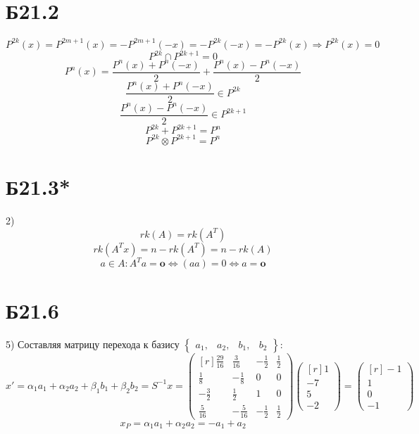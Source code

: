 \section*{Б21.2}
$$P^{2k}(x)=P^{2m+1}(x)=-P^{2m+1}(-x)=-P^{2k}(-x)=-P^{2k}(x)\Rightarrow P^{2k}(x)=0$$
$$P^{2k}\cap P^{2k+1}={0}$$
$$P^{n}(x)=\frac{P^{n}(x)+P^{n}(-x)}{2}+\frac{P^{n}(x)-P^{n}(-x)}{2}$$
$$\frac{P^{n}(x)+P^{n}(-x)}{2}\in P^{2k}$$
$$\frac{P^{n}(x)-P^{n}(-x)}{2}\in P^{2k+1}$$
$$P^{2k}+ P^{2k+1}=P^n$$
$$P^{2k}\otimes P^{2k+1}=P^{n}$$
\section*{Б21.3*}2)
$$rk(A)=rk(A^{T})$$
$$rk(A^{T}x)=n-rk(A^{T})=n-rk(A)$$
$$a\in A:A^{T}a=\textbf{o}\Leftrightarrow (aa)=0\Leftrightarrow a=\textbf{o}$$
\section*{Б21.6}5)
Составляя матрицу перехода к базису $\begin{Bmatrix}
a_1,&a_2,&b_1,&b_2
\end{Bmatrix}$:
\begin{equation*}
x'=\alpha_1a_1+\alpha_2a_2+\beta_1b_1+\beta_2b_2=S^{-1}x=
\begin{pmatrix*}[r]
\frac{29}{16}&\frac{3}{16}&-\frac{1}{2}&\frac{1}{2}\\
\frac{1}{8}&-\frac{1}{8}&0&0\\
-\frac{3}{2}&\frac{1}{2}&1&0\\
\frac{5}{16}&-\frac{5}{16}&-\frac{1}{2}&\frac{1}{2}
\end{pmatrix*}\begin{pmatrix*}[r]
1\\
-7\\
5\\
-2
\end{pmatrix*}=\begin{pmatrix*}[r]
-1\\
1\\
0\\
-1
\end{pmatrix*}
\end{equation*}
$$x_P=\alpha_1a_1+\alpha_2a_2=-a_1+a_2$$
